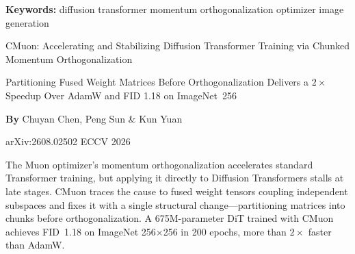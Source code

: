 \documentclass[10pt,twocolumn]{article}
\begin{document}
\setlength{\parindent}{0pt}
\setlength{\parskip}{4pt}

{\small\color{keywordgray}\textbf{Keywords:}
  diffusion transformer \textbullet{}
  momentum orthogonalization \textbullet{}
  optimizer \textbullet{}
  image generation}\par\vspace{4pt}

{\LARGE\bfseries\raggedright
  CMuon: Accelerating and Stabilizing Diffusion Transformer Training
  via Chunked Momentum Orthogonalization}\par\vspace{4pt}

{\large\itshape\raggedright
  Partitioning Fused Weight Matrices Before Orthogonalization Delivers a $2\times$
  Speedup Over AdamW and FID 1.18 on ImageNet~256}\par\vspace{6pt}

{\small\textbf{By} Chuyan Chen, Peng Sun \& Kun Yuan}\par\vspace{2pt}

{\small\color{keywordgray}arXiv:2608.02502 \textbullet{} ECCV 2026}
\par\vspace{2pt}\noindent{\color{rulered}\rule{\columnwidth}{0.6pt}}\vspace{6pt}

The Muon optimizer's momentum orthogonalization accelerates standard Transformer
training, but applying it directly to Diffusion Transformers stalls at late stages.
CMuon traces the cause to fused weight tensors coupling independent subspaces and
fixes it with a single structural change---partitioning matrices into chunks before
orthogonalization. A 675M-parameter DiT trained with CMuon achieves FID~1.18 on
ImageNet 256$\times$256 in 200 epochs, more than $2\times$ faster than AdamW.
\end{document}
